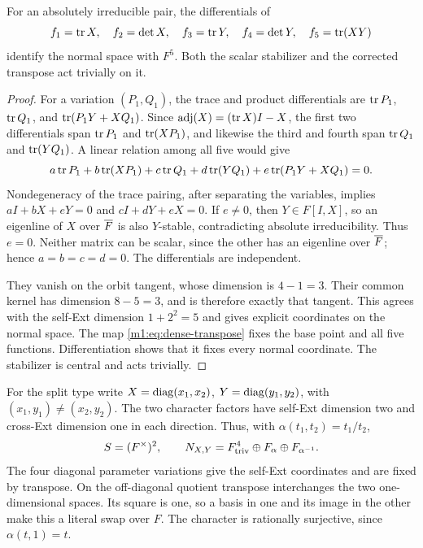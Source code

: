 \begin{proposition}\label{m1:prop:abs-irred-normal}
For an absolutely irreducible pair, the differentials of
\[
 f_1=\operatorname{tr} X,\quad f_2=\det X,\quad f_3=\operatorname{tr} Y,\quad
 f_4=\det Y,\quad f_5=\operatorname{tr}(XY)
\]
identify the normal space with $F^5$. Both the scalar stabilizer and the
corrected transpose act trivially on it.
\end{proposition}
\begin{proof}
For a variation $(P_1,Q_1)$, the trace and product differentials are
$\operatorname{tr} P_1$, $\operatorname{tr} Q_1$, and $\operatorname{tr}(P_1Y+XQ_1)$. Since
$\operatorname{adj}(X)=(\operatorname{tr} X)I-X$, the first two differentials span
$\operatorname{tr} P_1$ and $\operatorname{tr}(XP_1)$, and likewise the third and fourth span
$\operatorname{tr} Q_1$ and $\operatorname{tr}(YQ_1)$. A linear relation among all five would give
\[
 a\operatorname{tr} P_1+b\operatorname{tr}(XP_1)+c\operatorname{tr} Q_1+d\operatorname{tr}(YQ_1)
 +e\operatorname{tr}(P_1Y+XQ_1)=0.
\]
Nondegeneracy of the trace pairing, after separating the variables,
implies $aI+bX+eY=0$ and $cI+dY+eX=0$. If $e\neq0$, then
$Y\in F[I,X]$, so an eigenline of $X$ over $\overline F$ is also $Y$-stable,
contradicting absolute irreducibility. Thus $e=0$. Neither matrix can
be scalar, since the other has an eigenline over $\overline F$; hence
$a=b=c=d=0$. The differentials are independent.

They vanish on the orbit tangent, whose dimension is $4-1=3$. Their
common kernel has dimension $8-5=3$, and is therefore exactly that
tangent. This agrees with the self-Ext dimension $1+2^2=5$ and gives
explicit coordinates on the normal space. The map
\eqref{m1:eq:dense-transpose} fixes the base point and all five functions.
Differentiation shows that it fixes every normal coordinate. The
stabilizer is central and acts trivially.
\end{proof}

For the split type write
$X=\operatorname{diag}(x_1,x_2)$, $Y=\operatorname{diag}(y_1,y_2)$, with
$(x_1,y_1)\neq(x_2,y_2)$. The two character factors have self-Ext
dimension two and cross-Ext dimension one in each direction. Thus, with
$\alpha(t_1,t_2)=t_1/t_2$,
\begin{equation}\label{m1:eq:dense-split-normal}
 S=(F^\times)^2,\qquad N_{X,Y}=F^4_{\mathrm{triv}}\oplus F_\alpha
 \oplus F_{\alpha^{-1}}.
\end{equation}
The four diagonal parameter variations give the self-Ext coordinates and
are fixed by transpose. On the off-diagonal quotient transpose
interchanges the two one-dimensional spaces. Its square is one, so a
basis in one and its image in the other make this a literal swap over
$F$. The character is rationally surjective, since $\alpha(t,1)=t$.

